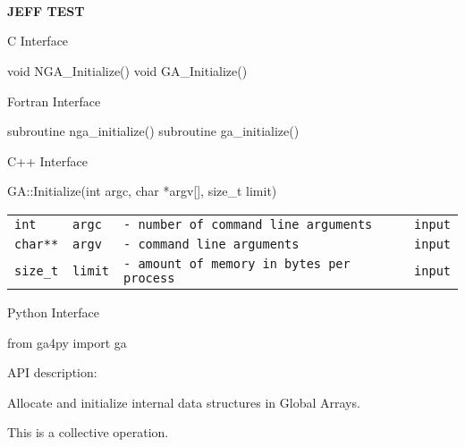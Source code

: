 \documentclass[12pt]{article}
\newcommand{\apih}[1]{
\hspace*{\fill} \\ \\ \\
\color{black}
\noindent
\textbf{\LARGE
#1
\newline
}
}
\newenvironment{desc}{
\noindent
\textcolor{copper}{API description:}

}{}
\newenvironment{fapi}{
\noindent
\textcolor{bronze}{Fortran Interface}
\small
}{
}
\newenvironment{capi}{
\noindent
\textcolor{bronze}{C Interface}
\small
}{
}
\newenvironment{cxxapi}{
\noindent
\textcolor{bronze}{C++ Interface}
\small
}{
}
\newenvironment{pyapi}{
\noindent
\textcolor{bronze}{Python Interface}
\small
}{
}
\newenvironment{funcargs}{
\begin{tabular}{ p{0.2\textwidth} p{0.2\textwidth} p{0.5\textwidth} p{0.1\textwidth} }
}{
\end{tabular}
}
\newcommand{\funcarg}[4]{
\texttt{#1} & \texttt{#2} & \texttt{- #3} & \texttt{#4} \\
}
\begin{document}
\apih{JEFF TEST}

\begin{capi}
\begin{ccode}
void NGA_Initialize()
void GA_Initialize()
\end{ccode}
\end{capi}

\begin{fapi}
\begin{fcode}
subroutine nga_initialize()
subroutine ga_initialize()
\end{fcode}
\end{fapi}

\begin{cxxapi}
\begin{cxxcode}
GA::Initialize(int argc, char *argv[], size_t limit)
\end{cxxcode}
\begin{funcargs}
\funcarg{int}   {argc} {number of command line arguments}     {input}
\funcarg{char**}{argv} {command line arguments}               {input}
\funcarg{size_t}{limit}{amount of memory in bytes per process}{input}
\end{funcargs}
\end{cxxapi}

\begin{pyapi}
\begin{pycode}
from ga4py import ga
\end{pycode}
\end{pyapi}

\begin{desc}
Allocate and initialize internal data structures in Global Arrays.

This is a collective operation.
\end{desc}
\end{document}
